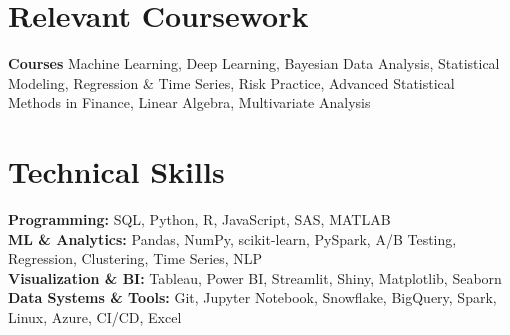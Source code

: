 \documentclass[letterpaper,11pt]{article}
\begin{document}
\section{Relevant Coursework}
\vspace{-5pt}
\begin{itemize}[leftmargin=0.15in, label={}]
  \small{
    \item{
        \textbf{Courses} Machine Learning, Deep Learning, Bayesian Data Analysis, Statistical Modeling, Regression \& Time Series, Risk Practice, Advanced Statistical Methods in Finance, Linear Algebra, Multivariate Analysis\\
        }
    }
        \end{itemize}

\vspace{-25pt}

\section{Technical Skills}
\vspace{-3pt}

\begin{itemize}[leftmargin=0.15in, label={}]
  \small{
    \item{
      \textbf{Programming:} SQL, Python, R, JavaScript, SAS, MATLAB \\
      \textbf{ML \& Analytics:} Pandas, NumPy, scikit-learn, PySpark, A/B Testing, Regression, Clustering, Time Series, NLP\\
      \textbf{Visualization \& BI:} Tableau, Power BI, Streamlit, Shiny, Matplotlib, Seaborn\\
      \textbf{Data Systems \& Tools:} Git, Jupyter Notebook, Snowflake, BigQuery, Spark, Linux, Azure, CI/CD, Excel \\
    }
  }
    \end{itemize}
    \vspace{-10pt}
\end{document}
